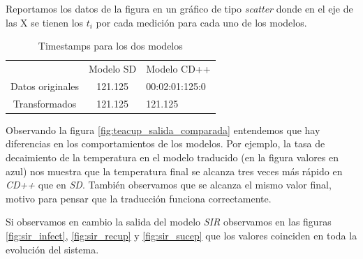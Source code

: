 Reportamos los datos de la figura en un gráfico de tipo \textit{scatter} donde en el eje de las X se tienen los $t_i$ por cada medición para cada uno de los modelos.

\begin{table}[H]
    \centering
    \label{tab:times}
    \begin{tabular}{c | c  l}
        & Modelo SD & Modelo CD++ \\
       Datos originales & 121.125 & 00:02:01:125:0 \\ 
        Transformados & 121.125 & 121.125
    \end{tabular}
    \caption{Timestamps para los dos modelos} 
\end{table}


Observando la figura \ref{fig:teacup_salida_comparada} entendemos que hay diferencias en los comportamientos de los modelos. Por ejemplo, la tasa de decaimiento de la temperatura en el modelo traducido (en la figura valores en azul) nos muestra que la temperatura final se alcanza tres veces más rápido en \textit{CD++} que en \textit{SD}.
También observamos que se alcanza el mismo valor final, motivo para pensar que la traducción funciona correctamente.

\begin{figure}[H]
    \centering     %
\end{figure}

Si observamos en cambio la salida del modelo \textit{SIR} observamos en las figuras \ref{fig:sir_infect}, \ref{fig:sir_recup} y \ref{fig:sir_sucep} que los valores coinciden en toda la evolución del sistema.

